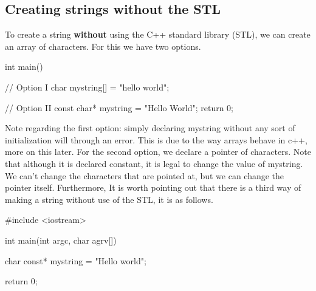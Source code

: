 \documentclass{report}
\begin{document}
%     
%     
%     
%     
    \pagebreak \bigbreak \noindent 
    \subsection{Creating strings without the STL}
    To create a string \textbf{without} using the C++ standard library (STL), we can create an array of characters. For this we have two options.
    \bigbreak \noindent 
    
    \begin{cppcode}
int main() {

    // Option I
    char mystring[] = "hello world";

    // Option II
    const char* mystring = "Hello World";
    return 0;
}
    \end{cppcode}
    
    \bigbreak \noindent 
    Note regarding the first option: simply declaring mystring without any sort of initialization will through an error. This is due to the way arrays behave in c++, more on this later.
    \bigbreak \noindent 
    For the second option, we declare a pointer of characters. Note that although it is declared constant, it is legal to change the value of mystring. We can't change the characters that are pointed at, but we can change the pointer itself.
    \bigbreak \noindent 
    Furthermore, It is worth pointing out that there is a third way of making a string without use of the STL, it is as follows.
    \bigbreak \noindent 
    
    \begin{cppcode}
#include <iostream>

int main(int argc, char agrv[]){

    char const* mystring = "Hello world";

    return 0;
}
    \end{cppcode}
    
\end{document}
